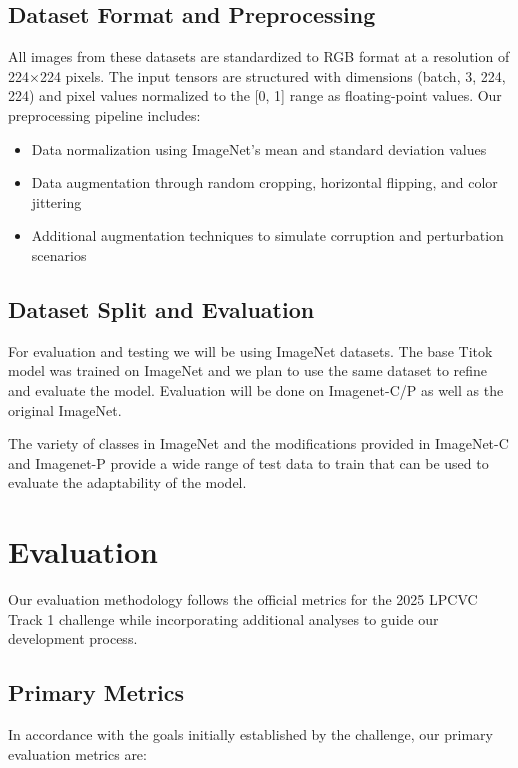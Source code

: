 \documentclass[11pt, oneside]{article}   	%
\begin{document}
\subsection*{Dataset Format and Preprocessing}

All images from these datasets are standardized to RGB format at a resolution of 224×224 pixels. The input tensors are structured with dimensions (batch, 3, 224, 224) and pixel values normalized to the [0, 1] range as floating-point values. Our preprocessing pipeline includes:

\begin{itemize}
\item Data normalization using ImageNet's mean and standard deviation values
\item Data augmentation through random cropping, horizontal flipping, and color jittering
\item Additional augmentation techniques to simulate corruption and perturbation scenarios
\end{itemize}

\subsection*{Dataset Split and Evaluation}

For evaluation and testing we will be using ImageNet datasets. The base Titok model was trained on ImageNet and we plan to use the same dataset to refine and evaluate the model. Evaluation will be done on Imagenet-C/P as well as the original ImageNet. 

The variety of classes in ImageNet and the modifications provided in ImageNet-C and Imagenet-P provide a wide range of test data to train that can be used to evaluate the adaptability of the model.

\section*{Evaluation}

Our evaluation methodology follows the official metrics for the 2025 LPCVC Track 1 challenge while incorporating additional analyses to guide our development process. 

\subsection*{Primary Metrics}

In accordance with the goals initially established by the challenge, our primary evaluation metrics are:
\end{document}
